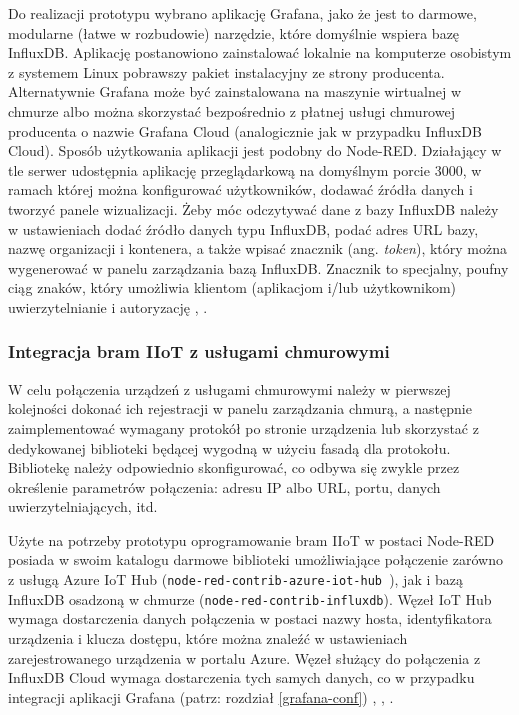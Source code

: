 \documentclass[a4paper, 12pt, twoside]{article}
\begin{document}
Do realizacji prototypu wybrano aplikację Grafana, jako że jest to darmowe,
modularne (łatwe w rozbudowie) narzędzie, które domyślnie wspiera
bazę InfluxDB. Aplikację postanowiono zainstalować lokalnie na komputerze osobistym
z systemem Linux pobrawszy pakiet instalacyjny ze strony producenta.
Alternatywnie Grafana może być zainstalowana na maszynie wirtualnej w
chmurze albo można skorzystać bezpośrednio z płatnej usługi chmurowej producenta
o nazwie Grafana Cloud (analogicznie jak w przypadku InfluxDB Cloud).
Sposób użytkowania aplikacji jest podobny do Node-RED. Działający w tle
serwer udostępnia aplikację przeglądarkową na domyślnym porcie 3000, w ramach której
można konfigurować użytkowników, dodawać źródła danych i tworzyć panele wizualizacji.
Żeby móc odczytywać dane z bazy InfluxDB należy w ustawieniach dodać źródło danych
typu InfluxDB, podać adres URL bazy, nazwę organizacji i kontenera, a także wpisać
znacznik (ang. \emph{token}), który można wygenerować w panelu
zarządzania bazą InfluxDB. Znacznik to specjalny, poufny ciąg znaków, który
umożliwia klientom (aplikacjom i/lub użytkownikom) uwierzytelnianie i autoryzację
\cite{grafana-doc}, \cite{influx-db}.


\subsubsection{Integracja bram IIoT z usługami chmurowymi}

W celu połączenia urządzeń z usługami chmurowymi należy w pierwszej kolejności
dokonać ich rejestracji w panelu zarządzania chmurą, a następnie zaimplementować
wymagany protokół po stronie urządzenia lub skorzystać z dedykowanej biblioteki
będącej wygodną w użyciu fasadą dla protokołu. Bibliotekę należy odpowiednio
skonfigurować, co odbywa się zwykle przez określenie parametrów połączenia:
adresu IP albo URL, portu, danych uwierzytelniających, itd.

Użyte na potrzeby prototypu oprogramowanie bram IIoT w postaci Node-RED
posiada w swoim katalogu darmowe biblioteki umożliwiające połączenie zarówno z usługą
Azure IoT Hub (\texttt{node-red-contrib-azure-iot-hub }),
jak i bazą InfluxDB osadzoną w chmurze (\texttt{node-red-contrib-influxdb}).
Węzeł IoT Hub wymaga dostarczenia danych połączenia w postaci nazwy hosta,
identyfikatora urządzenia i klucza dostępu, które można znaleźć w ustawieniach
zarejestrowanego urządzenia w portalu Azure. Węzeł służący do połączenia z
InfluxDB Cloud wymaga dostarczenia tych samych danych, co w przypadku integracji
aplikacji Grafana (patrz: rozdział \ref{grafana-conf}) \cite{node-red-flows},
\cite{influx-db}, \cite{iot-hub-doc}.
\end{document}
